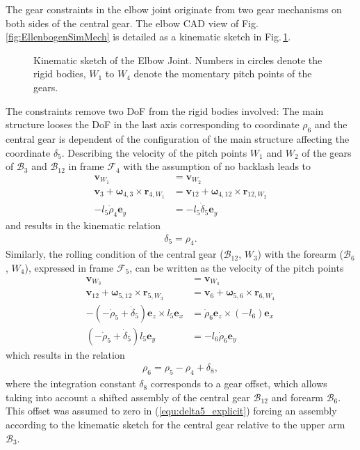 \documentclass[letterpaper, 10 pt, conference]{ieeeconf}  %
\newcommand{\body}[1]{\mathcal{B}_{#1}}
\newcommand{\ks}[1]{\mathcal{F}_{#1}}
\begin{document}
The gear constraints in the elbow joint originate from two gear mechanisms on both sides of the central gear.
The elbow CAD view of Fig.\,\ref{fig:EllenbogenSimMech} is detailed as a kinematic sketch in Fig.\,\ref{fig:KAS5_elbow}.
%
\begin{figure}[htb]
    \small
    \begin{minipage}[t]{7.5cm}
        \vspace{0.2cm} %
        
    \end{minipage}
    
    \caption{Kinematic sketch of the Elbow Joint. Numbers in circles denote the rigid bodies, $W_1$ to $W_4$ denote the momentary pitch points of the gears.}
    \label{fig:KAS5_elbow}
\end{figure}
%
The constraints remove two DoF from the rigid bodies involved:
The main structure looses the DoF in the last axis corresponding to coordinate $\rho_6$ and the central gear is dependent of the configuration of the main structure affecting the coordinate $\delta_5$.
%
Describing the velocity of the pitch points $W_1$ and $W_2$ of the gears of $\body{3}$ and $\body{12}$ in frame $\ks{4}$ with the assumption of no backlash leads to
%
\begin{align}
\bm{v}_{W_1} &= \bm{v}_{W_2} \\
\bm{v}_{3} +\bm{\omega}_{4,3} \times \bm{r}_{4,W_1} &= \bm{v}_{12} +\bm{\omega}_{4,12} \times \bm{r}_{12,W_2} \\
-l_{5}\dot{\rho}_4\bm{e}_y &= -l_{5}\dot{\delta}_5\bm{e}_y
\end{align}
%
and results in the kinematic relation
%
\begin{align}
\delta_5 = \rho_4.
\label{equ:delta5_explicit}
\end{align}
%
Similarly, the rolling condition of the central gear ($\body{12}$, $W_3$) with the forearm ($\body{6}$, $W_4$), expressed in frame $\ks{5}$, can be written as the velocity of the pitch points
%
\begin{align}
\bm{v}_{W_3} &= \bm{v}_{W_4} \\
\bm{v}_{12} +\bm{\omega}_{5,12} \times \bm{r}_{5,W_3} &= \bm{v}_{6} +\bm{\omega}_{5,6} \times \bm{r}_{6,W_4} \\
-(-\dot{\rho}_5+\dot{\delta}_5)\bm{e}_z \times l_5\bm{e}_x &= \dot{\rho}_6\bm{e}_z \times (-l_6)\bm{e}_x \\
(-\dot{\rho}_5+\dot{\delta}_5) l_5 \bm{e}_y &= -l_6 \dot{\rho}_6\bm{e}_y
\end{align}
%
which results in the relation
%
\begin{align}
\rho_6 = \rho_5 - \rho_4 + \delta_8,
\end{align}
%
where the integration constant $\delta_8$ corresponds to a gear offset, which allows taking into account a shifted assembly of the central gear $\body{12}$ and forearm $\body{6}$. This offset was assumed to zero in (\ref{equ:delta5_explicit}) forcing an assembly according to the kinematic sketch for the central gear relative to the upper arm $\body{3}$.
\end{document}
